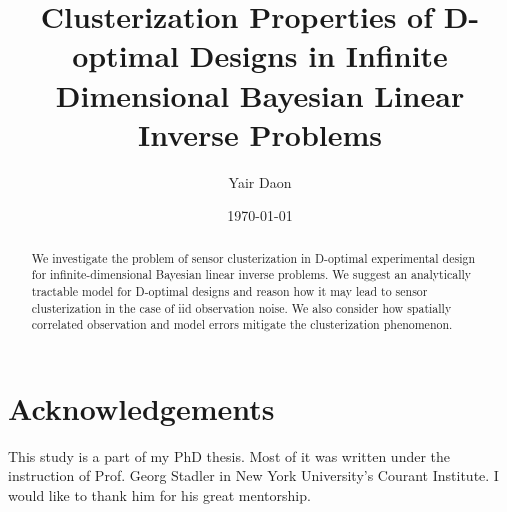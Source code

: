 \documentclass{amsart}
\numberwithin{equation}{section}
\begin{document}
\title[Clusterization Properties of D-optimal Designs]{Clusterization
  Properties of D-optimal Designs in Infinite Dimensional Bayesian
  Linear Inverse Problems}

\author{Yair Daon}
\address{Porter School of the Environment and Earth
  Sciences, Tel Aviv University\\ Tel Aviv, Israel}

\date{\today}

\begin{abstract}
  We investigate the problem of sensor clusterization in D-optimal
  experimental design for infinite-dimensional Bayesian linear inverse
  problems. We suggest an analytically tractable model for D-optimal
  designs and reason how it may lead to sensor clusterization in the
  case of iid observation noise. We also consider how spatially
  correlated observation and model errors mitigate the clusterization
  phenomenon.

\end{abstract}

\maketitle









\section{Acknowledgements}
This study is a part of my PhD thesis. Most of it was written under
the instruction of Prof. Georg Stadler in New York University's
Courant Institute. I would like to thank him for his great
mentorship.
\end{document}
